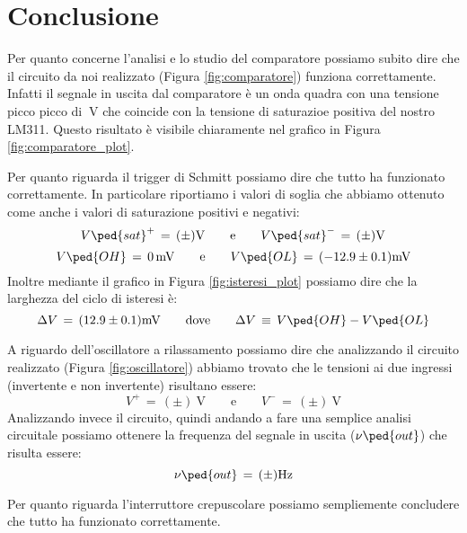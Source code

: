 \section*{Conclusione}

Per quanto concerne l'analisi e lo studio del comparatore possiamo subito dire che il circuito da noi realizzato (Figura \ref{fig:comparatore}) funziona correttamente. Infatti il segnale in uscita dal comparatore è un onda quadra con una tensione picco picco di $\SI{}{\volt}$ che coincide con la tensione di saturazioe positiva del nostro LM311. Questo risultato è visibile chiaramente nel grafico in Figura \ref{fig:comparatore_plot}.

Per quanto riguarda il trigger di Schmitt possiamo dire che tutto ha funzionato correttamente. In particolare riportiamo i valori di soglia che abbiamo ottenuto come anche i valori di saturazione positivi e negativi:
\begin{equation}
        V\ped{sat}^+\,=\,(\pm)\SI{}{\volt} \qquad \text{e} \qquad V\ped{sat}^-\,=\,(\pm)\SI{}{\volt}
\end{equation}
\begin{equation}
        V\ped{OH}\,=\,\SI{0}{\milli\volt} \qquad \text{e} \qquad V\ped{OL}\,=\,(-12.9\pm0.1)\SI{}{\milli\volt}
\end{equation}
Inoltre mediante il grafico in Figura \ref{fig:isteresi_plot} possiamo dire che la larghezza del ciclo di isteresi è:
\begin{equation}
        \Delta V \,=\,(12.9\pm0.1)\SI{}{\milli\volt} \qquad \text{dove} \qquad \Delta V \,\equiv\, V\ped{OH} - V\ped{OL} 
\end{equation}

A riguardo dell'oscillatore a rilassamento possiamo dire che analizzando il circuito realizzato (Figura \ref{fig:oscillatore}) abbiamo trovato che le tensioni ai due ingressi (invertente e non invertente) risultano essere:
\begin{equation}
        V^+\,=\,(\pm)\SI{}{\volt} \qquad \text{e} \qquad V^-\,=\,(\pm)\SI{}{\volt}
\end{equation}
Analizzando invece il circuito, quindi andando a fare una semplice analisi circuitale possiamo ottenere la frequenza del segnale in uscita ($\nu\ped{out}$) che risulta essere:
\begin{equation}
        \nu\ped{out}\,=\,(\pm)\SI{}{\hertz}
\end{equation}

Per quanto riguarda l'interruttore crepuscolare possiamo sempliemente concludere che tutto ha funzionato correttamente.
